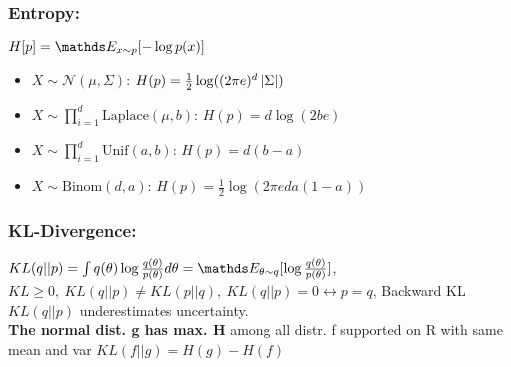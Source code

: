 \subsubsection{Entropy:}
$H[p] = \E[x \sim p]{-\log p(x)}$
\begin{itemize}
    \item $X \sim \mathcal{N}(\mu, \Sigma)$: $H(p)=\frac{1}{2} \log ((2\pi e)^{d} \left\lvert\Sigma\right\rvert)$
    \item $X \sim \prod_{i=1}^{d} \text{Laplace}(\mu, b)$: $H(p)=d \log (2be)$
    \item $X \sim \prod_{i=1}^{d} \text{Unif}(a, b)$: $H(p)=d(b-a)$
    \item $X \sim \text{Binom}(d, a)$: $H(p)=\frac{1}{2} \log (2\pi ed a (1-a)) $
\end{itemize}

\subsubsection{KL-Divergence:}
$KL(q||p) = \int q(\theta) \log \frac{q(\theta)}{p(\theta)}d\theta = \E[\theta \sim q]{\log \frac{q(\theta)}{p(\theta)}}$,
$KL \geq 0,\ KL(q||p) \neq KL(p||q),\ KL(q||p) = 0 \leftrightarrow p=q$,
Backward KL $KL(q||p)$ underestimates uncertainty.\\

\textbf{The normal dist. g has max. H} among all distr. f supported on R with same mean and var
$KL(f||g) = H(g)-H(f)$\\

